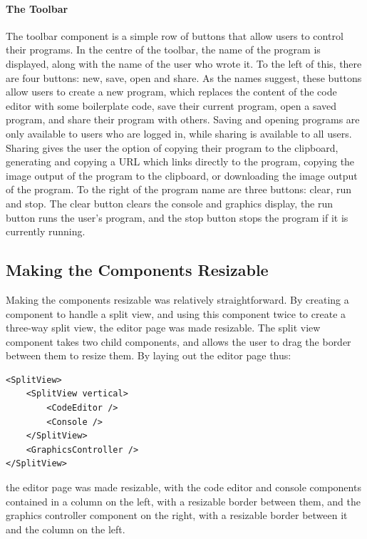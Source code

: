 \documentclass[../main.tex]{subfiles}
\begin{document}
                \paragraph{The Toolbar}
                    The toolbar component is a simple row of buttons that allow users to control
                        their programs.
                    In the centre of the toolbar, the name of the program is displayed, along with
                        the name of the user who wrote it.
                    To the left of this, there are four buttons: new, save, open and share.
                    As the names suggest, these buttons allow users to create a new program, which
                        replaces the content of the code editor with some boilerplate code, save their
                        current program, open a saved program, and share their program with others.
                    Saving and opening programs are only available to users who are logged in,
                        while sharing is available to all users.
                    Sharing gives the user the option of copying their program to the clipboard,
                        generating and copying a URL which links directly to the program, copying the
                        image output of the program to the clipboard, or downloading the image output
                        of the program.
                    To the right of the program name are three buttons: clear, run and stop.
                    The clear button clears the console and graphics display, the run button runs
                        the user's program, and the stop button stops the program if it is currently
                        running.

        \subsection{Making the Components Resizable}
            Making the components resizable was relatively straightforward.
            By creating a component to handle a split view, and using this component twice
                to create a three-way split view, the editor page was made resizable.
            The split view component takes two child components, and allows the user to
                drag the border between them to resize them.
            By laying out the editor page thus: \begin{lstlisting}[caption={A simplified version of the editor page layout.},
                label={lst:editorLayout}]
<SplitView>
    <SplitView vertical>
        <CodeEditor />
        <Console />
    </SplitView>
    <GraphicsController />
</SplitView>\end{lstlisting} the editor page was
                made resizable, with the code editor and console components contained in a
                column on the left, with a resizable border between them, and the graphics
                controller component on the right, with a resizable border between it and the
                column on the left.
\end{document}
